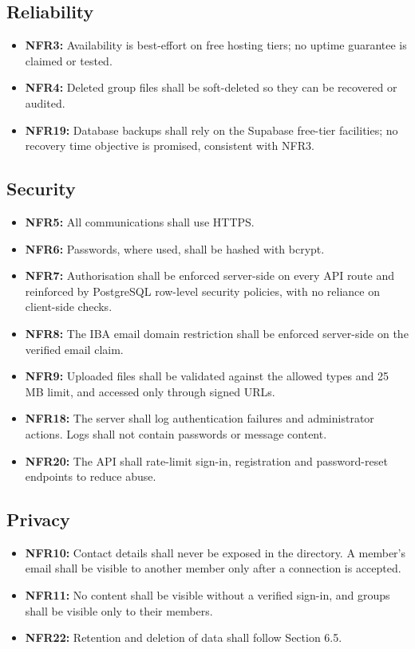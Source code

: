 \documentclass[10pt,a4paper]{article}
\begin{document}
\subsection{Reliability}
\begin{itemize}
\item \textbf{NFR3:} Availability is best-effort on free hosting tiers; no uptime guarantee is claimed or tested.
\item \textbf{NFR4:} Deleted group files shall be soft-deleted so they can be recovered or audited.
\item \textbf{NFR19:} Database backups shall rely on the Supabase free-tier facilities; no recovery time objective is promised, consistent with NFR3.
\end{itemize}
\subsection{Security}
\begin{itemize}
\item \textbf{NFR5:} All communications shall use HTTPS.
\item \textbf{NFR6:} Passwords, where used, shall be hashed with bcrypt.
\item \textbf{NFR7:} Authorisation shall be enforced server-side on every API route and reinforced by PostgreSQL row-level security policies, with no reliance on client-side checks.
\item \textbf{NFR8:} The IBA email domain restriction shall be enforced server-side on the verified email claim.
\item \textbf{NFR9:} Uploaded files shall be validated against the allowed types and 25 MB limit, and accessed only through signed URLs.
\item \textbf{NFR18:} The server shall log authentication failures and administrator actions. Logs shall not contain passwords or message content.
\item \textbf{NFR20:} The API shall rate-limit sign-in, registration and password-reset endpoints to reduce abuse.
\end{itemize}
\subsection{Privacy}
\begin{itemize}
\item \textbf{NFR10:} Contact details shall never be exposed in the directory. A member's email shall be visible to another member only after a connection is accepted.
\item \textbf{NFR11:} No content shall be visible without a verified sign-in, and groups shall be visible only to their members.
\item \textbf{NFR22:} Retention and deletion of data shall follow Section 6.5.
\end{itemize}
\end{document}
